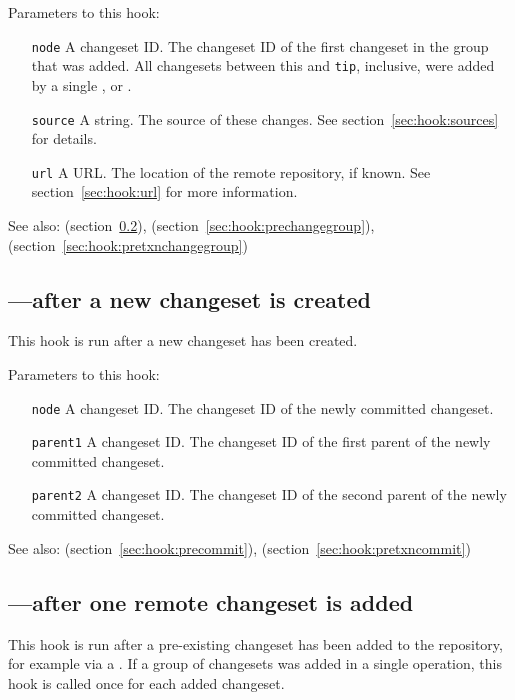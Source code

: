 Parameters to this hook:
\begin{itemize}
\item[\texttt{node}] A changeset ID.  The changeset ID of the first
  changeset in the group that was added.  All changesets between this
  and \texttt{tip}, inclusive, were added by
  a single ,  or .
\item[\texttt{source}] A string.  The source of these changes.  See
  section~\ref{sec:hook:sources} for details.
\item[\texttt{url}] A URL.  The location of the remote repository, if
  known.  See section~\ref{sec:hook:url} for more information.
\end{itemize}

See also:  (section~\ref{sec:hook:incoming}),
 (section~\ref{sec:hook:prechangegroup}),
 (section~\ref{sec:hook:pretxnchangegroup})

\subsection{---after a new changeset is created}
\label{sec:hook:commit}

This hook is run after a new changeset has been created.

Parameters to this hook:
\begin{itemize}
\item[\texttt{node}] A changeset ID.  The changeset ID of the newly
  committed changeset.
\item[\texttt{parent1}] A changeset ID.  The changeset ID of the first
  parent of the newly committed changeset.
\item[\texttt{parent2}] A changeset ID.  The changeset ID of the second
  parent of the newly committed changeset.
\end{itemize}

See also:  (section~\ref{sec:hook:precommit}),
 (section~\ref{sec:hook:pretxncommit})

\subsection{---after one remote changeset is added}
\label{sec:hook:incoming}

This hook is run after a pre-existing changeset has been added to the
repository, for example via a .  If a group of changesets
was added in a single operation, this hook is called once for each
added changeset.

